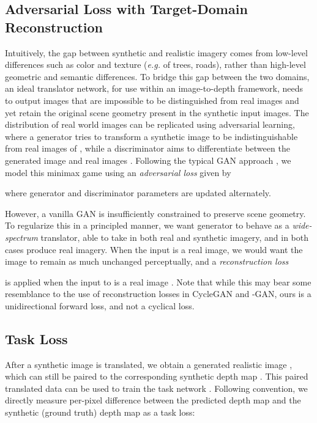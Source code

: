 \documentclass[runningheads]{llncs}
\def\eg{\emph{e.g.}\xspace}
\begin{document}
\subsection{Adversarial Loss with Target-Domain Reconstruction}

Intuitively, the gap between synthetic and realistic imagery comes from low-level differences such as color and texture (\eg of trees, roads), rather than high-level geometric and semantic differences. To bridge this gap between the two domains, an ideal translator network, for use within an image-to-depth framework, needs to output images that are impossible to be distinguished from real images and yet retain the original scene geometry present in the synthetic input images. The distribution of real world images can be replicated using adversarial learning, where a generator  tries to transform a synthetic image  to be indistinguishable from real images of , while a discriminator  aims to differentiate between the generated image  and real images . Following the typical GAN approach \cite{goodfellow2014generative}, we model this minimax game using an \emph{adversarial loss} given by

where generator and discriminator parameters are updated alternately.

However, a vanilla GAN is insufficiently constrained to preserve scene geometry. To regularize this in a principled manner, we want generator  to behave as a \emph{wide-spectrum} translator, able to take in both real and synthetic imagery, and in both cases produce real imagery. When the input is a real image, we would want the image to remain as much unchanged perceptually, and a \emph{reconstruction loss}

is applied when the input to  is a real image . Note that while this may bear some resemblance to the use of reconstruction losses in CycleGAN \cite{zhu2017unpaired} and -GAN\cite{rosca2017variational}, ours is a unidirectional forward loss, and not a cyclical loss. 

\subsection{Task Loss}
After a synthetic image  is translated, we obtain a generated realistic image , which can still be paired to the corresponding synthetic depth map . This paired translated data  can be used to train the task network . Following convention, we directly measure per-pixel difference between the predicted depth map and the synthetic (ground truth) depth map as a task loss:
\end{document}
